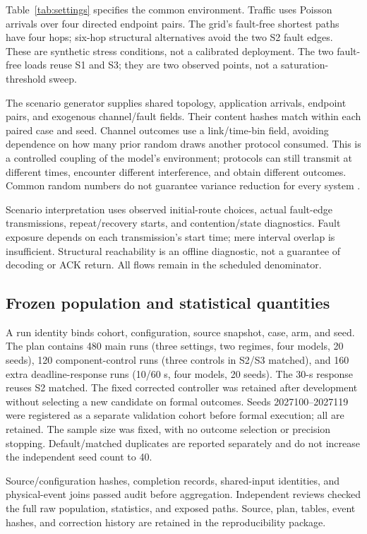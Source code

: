 Table~\ref{tab:settings} specifies the common environment. Traffic uses
Poisson arrivals over four directed endpoint pairs. The grid's fault-free
shortest paths have four hops; six-hop structural alternatives avoid the
two S2 fault edges. These are synthetic stress conditions, not a calibrated
deployment. The two fault-free loads reuse S1 and S3; they are two observed
points, not a saturation-threshold sweep.

The scenario generator supplies shared topology, application arrivals,
endpoint pairs, and exogenous channel/fault fields. Their content hashes
match within each paired case and seed. Channel outcomes use a
link/time-bin field, avoiding dependence on how many prior random draws
another protocol consumed. This is a controlled coupling of the model's
environment; protocols can still transmit at different times, encounter
different interference, and obtain different outcomes. Common random
numbers do not guarantee variance reduction for every system
\cite{glasserman1992crn}.

Scenario interpretation uses observed initial-route choices, actual
fault-edge transmissions, repeat/recovery starts, and contention/state
diagnostics. Fault exposure depends on each transmission's start time;
mere interval overlap is insufficient. Structural reachability is an
offline diagnostic, not a guarantee of decoding or ACK return. All flows
remain in the scheduled denominator.

\subsection{Frozen population and statistical quantities}

A run identity binds cohort, configuration, source snapshot, case, arm,
and seed. The plan contains 480 main runs (three settings, two regimes,
four models, 20 seeds), 120 component-control runs (three controls in S2/S3
matched), and 160 extra deadline-response runs (10/60 s, four models,
20 seeds). The 30-s response reuses S2 matched. The fixed corrected
controller was retained after development without selecting a new
candidate on formal outcomes. Seeds 2027100--2027119 were registered as
a separate validation cohort before formal execution; all are retained.
The sample size was fixed, with no outcome selection or precision stopping.
Default/matched duplicates are reported separately and do not increase
the independent seed count to 40.

Source/configuration hashes, completion records, shared-input identities,
and physical-event joins passed audit before aggregation. Independent
reviews checked the full raw population, statistics, and exposed paths.
Source, plan, tables, event hashes, and correction history are retained
in the reproducibility package.

